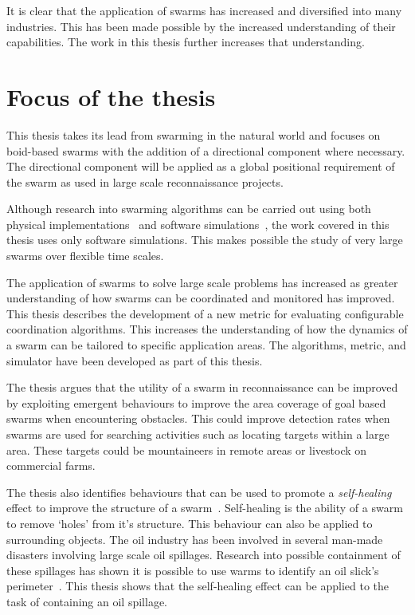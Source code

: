It is clear that the application of swarms has increased and diversified into many industries. This has been made possible by the increased understanding of their capabilities. The work in this thesis further increases that understanding.

\section{Focus of the thesis}
This thesis takes its lead from swarming in the natural world and focuses on boid-based swarms with the addition of a directional component where necessary. The directional component will be applied as a global positional requirement of the swarm as used in large scale reconnaissance projects.

Although research into swarming algorithms can be carried out using both physical implementations~\cite{DOR:09, DTGT:04} and software simulations~\cite{BAF:06, GP:02}, the work covered in this thesis uses only software simulations. This makes possible the study of very large swarms over flexible time scales.

The application of swarms to solve large scale problems has increased as greater understanding of how swarms can be coordinated and monitored has improved. This thesis describes the development of a new metric for evaluating configurable coordination algorithms. This increases the understanding of how the dynamics of a swarm can be tailored to specific application areas. The algorithms, metric, and simulator have been developed as part of this thesis.

The thesis argues that the utility of a swarm in reconnaissance can be improved by exploiting emergent behaviours to improve the area coverage of goal based swarms when encountering obstacles. This could improve detection rates when swarms are used for searching  activities such as locating targets within a large area. These targets could be mountaineers in remote areas or livestock on commercial farms. 

The thesis also identifies behaviours that can be used to promote a \emph{self-healing} effect to improve the structure of a swarm~\cite{RS:08}. Self-healing is the ability of a swarm to remove `holes' from it's structure. This behaviour can also be applied to surrounding objects. The oil industry has been involved in several man-made disasters involving large scale oil spillages. Research into possible containment of these spillages has shown it is possible to use warms to identify an oil slick's perimeter~\cite{ZFG:13}. This thesis shows that the self-healing effect can be applied to the task of containing an oil spillage.
 

